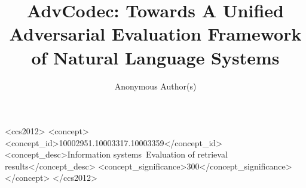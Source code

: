 \documentclass[sigconf,anonymous,review]{acmart}
\begin{document}
\title{AdvCodec: Towards A Unified Adversarial Evaluation Framework of Natural Language Systems}
\author{Anonymous Author(s)}

\renewcommand{\shortauthors}{Anonymous Author(s)}



%
%
\begin{CCSXML}
<ccs2012>
<concept>
<concept_id>10002951.10003317.10003359</concept_id>
<concept_desc>Information systems~Evaluation of retrieval results</concept_desc>
<concept_significance>300</concept_significance>
</concept>
</ccs2012>
\end{CCSXML}



\maketitle









\end{document}
